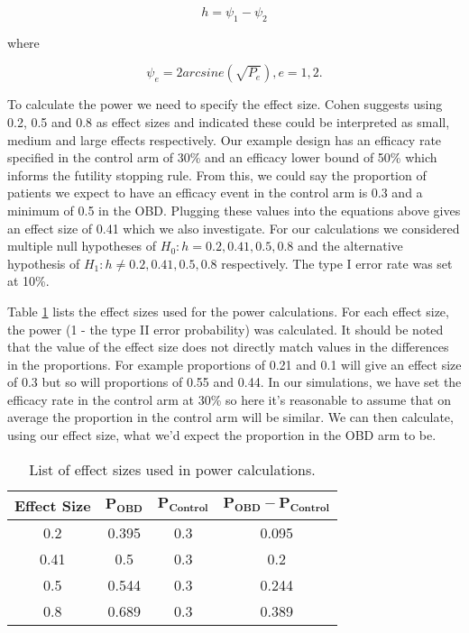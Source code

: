 \begin{equation}
	h = \psi_1 - \psi_2
\end{equation}

where 

\begin{equation}
	\psi_e = 2arcsine(\sqrt{P_e}), e = 1,2.
\end{equation}

To calculate the power we need to specify the effect size.  Cohen \cite{cohenStatisticalPowerAnalysis1988} suggests using 0.2, 0.5 and 0.8 as effect sizes and indicated these could be interpreted as small, medium and large effects respectively. Our example design has an efficacy rate specified in the control arm of 30\% and an efficacy lower bound of 50\% which informs the futility stopping rule. From this, we could say the proportion of patients we expect to have an efficacy event in the control arm is 0.3 and a minimum of 0.5 in the OBD. Plugging these values into the equations above gives an effect size of 0.41 which we also investigate.  For our calculations we considered multiple null hypotheses of $H_0: h = 0.2,0.41,0.5,0.8$ and the alternative hypothesis of $H_1: h \neq 0.2,0.41,0.5,0.8$ respectively. The type \RN{1} error rate was set at 10\%.

Table \ref{tab_wt:EffectSizes} lists the effect sizes used for the power calculations. For each effect size, the power (1 - the type \RN{2} error probability) was calculated. It should be noted that the value of the effect size does not directly match values in the differences in the proportions. For example proportions of 0.21 and 0.1 will give an effect size of 0.3 but so will proportions of 0.55 and 0.44. In our simulations, we have set the efficacy rate in the control arm at 30\% so here it's reasonable to assume that on average the proportion in the control arm will be similar. We can then calculate, using our effect size, what we'd expect the proportion in the OBD arm to be. 

\begin{table}[h!]
	\centering
	\caption{List of effect sizes used in power calculations.}
	\label{tab_wt:EffectSizes}
	\begin{tabular}{c|ccc}
		\hline
		\textbf{Effect Size} & $\mathbf{P_{OBD}}$ & $\mathbf{P_{Control}}$ & $\mathbf{P_{OBD} - P_{Control}}$ \\ \hline
		0.2                  & 0.395           & 0.3                 & 0.095          \\
		0.41                 & 0.5             & 0.3                 & 0.2            \\
		0.5                  & 0.544           & 0.3                 & 0.244          \\
		0.8                  & 0.689           & 0.3                 & 0.389          \\ \hline
	\end{tabular}
\end{table}

